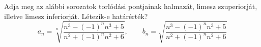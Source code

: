 \documentclass[11pt]{scrartcl}
\begin{document}
Adja meg az alábbi sorozatok torlódási pontjainak halmazát, limesz
szuperiorját, illetve limesz inferiorját. Létezik-e határérték?
\[
	a_n = \sqrt[n]{\frac{n^3 - (-1)^n n^3 + 5}{n^2 + (-1)^n n^2 + 6}}, \qquad
	b_n = \sqrt{\frac{n^3 - (-1)^n n^3 + 5}{n^2 + (-1)^n n^2 + 6}}
\]
\end{document}
